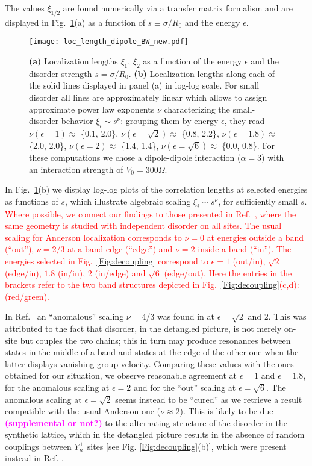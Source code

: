 \documentclass[prl,aps,twocolumn,showpacs,superscriptaddress,longbibliography]{revtex4-1}
\newcommand{\changer}[1]{\textcolor{red}{#1}}
\newcommand{\tochange}[1]{\textcolor{magenta}{#1}}
\newcommand{\mm}[1]{{\tochange{\footnotesize{\bf (#1)}}}}
\begin{document}
The values $\xi_{1/2}$ are found numerically via a transfer matrix formalism and are displayed in Fig.~\ref{Fig:2D_loc_length}(a) as a function of $s \equiv \sigma / R_0$ and the energy $\epsilon$.
\begin{figure}
\texttt{[image: loc\_length\_dipole\_BW\_new.pdf]}
\caption{\textbf{(a)} Localization lengths $\xi_1,\,\xi_2$ as a function of the energy $\epsilon$ and the disorder strength $s = \sigma / R_0$.
\textbf{(b)} Localization lengths along each of the solid lines displayed in panel (a) in log-log scale. For small disorder all lines are approximately linear which allows to assign approximate power law exponents $\nu$ characterizing the small-disorder behavior $\xi_i \sim s^\nu$: grouping them by energy $\epsilon$, they read $\nu\left(\epsilon = 1\right) \approx$ \{0.1, 2.0\}, $\nu\left(\epsilon = \sqrt{2}\right)\approx$ \{0.8, 2.2\}, $\nu\left(\epsilon = 1.8\right)\approx$ \{2.0, 2.0\}, $\nu\left(\epsilon = 2\right)\approx$ \{1.4, 1.4\}, $\nu\left(\epsilon = \sqrt{6}\right)\approx$ \{0.0, 0.8\}. For these computations we chose a dipole-dipole interaction ($\alpha = 3$) with an interaction strength of $V_0 = 300\Omega$.}
 \label{Fig:2D_loc_length}
\end{figure}
In Fig.~\ref{Fig:2D_loc_length}(b) we display log-log plots of the correlation lengths at selected energies as functions of $s$, which illustrate algebraic scaling $\xi_i \sim s^\nu$, for sufficiently small $s$. \changer{Where possible, we connect our findings to those presented in Ref.~\cite{Leykam2017}, where the same geometry is studied with independent disorder on all sites. The usual scaling for Anderson localization corresponds to $\nu = 0$ at energies outside a band (``out''), $\nu = 2/3$ at a band edge (``edge'') and $\nu = 2$ inside a band (``in''). The energies selected in Fig.~\ref{Fig:decoupling} correspond to $\epsilon =1$ (out/in), $\sqrt{2}$ (edge/in), $1.8$ (in/in), $2$ \changer{(in/edge)} and $\sqrt{6}$ \changer{(edge/out)}. Here the entries in the brackets refer to the two band structures depicted in Fig.~\ref{Fig:decoupling}(c,d): (red/green).}

In Ref.~\cite{Leykam2017} an ``anomalous'' scaling $\nu = 4/3$ was found in at $\epsilon = \sqrt{2}$ and $2$. This was attributed to the fact that disorder, in the detangled picture, is not merely on-site but couples the two chains; this in turn may produce resonances between states in the middle of a band and states at the edge of the other one when the latter displays vanishing group velocity. Comparing these values with the ones obtained for our situation, we observe reasonable agreement at $\epsilon = 1$ and $\epsilon = 1.8$, for the anomalous scaling at $\epsilon = 2$ and for the ``out'' scaling at $\epsilon = \sqrt{6}$. The anomalous scaling at $\epsilon = \sqrt{2}$ seems instead to be ``cured'' as we retrieve a result compatible with the usual Anderson one ($\nu  \approx 2$). This is likely to be due \mm{supplemental or not?} to the alternating structure of the disorder in the synthetic lattice, which in the detangled picture results in the absence of random couplings between $Y_n^{\pm}$ sites [see Fig. \ref{Fig:decoupling}(b)], which were present instead in Ref. \cite{Leykam2017}.
\end{document}
